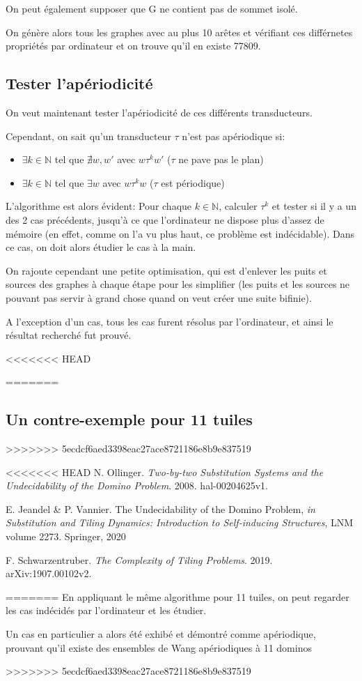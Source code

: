 \documentclass{scrartcl}
\newcommand{\N}{\mathbb N}
\theoremstyle{definition}
\theoremstyle{remark}
\begin{document}
On peut également supposer que G ne contient pas de sommet isolé.

On génère alors tous les graphes avec au plus 10 arêtes et vérifiant ces différnetes propriétés par ordinateur
et on trouve qu'il en existe 77809.

\subsection{Tester l'apériodicité}

On veut maintenant tester l'apériodicité de ces différents transducteurs.

Cependant, on sait qu'un transducteur $\tau$ n'est pas apériodique si:

\begin{itemize}
    \item $\exists k \in \N$ tel que $\nexists w,w'$ avec $w \tau^k w'$ ($\tau$ ne pave pas le plan)
    \item $\exists k \in \N$ tel que $\exists w$ avec $w \tau^k w$ ($\tau$ est périodique)
\end{itemize}

L'algorithme est alors évident: Pour chaque $k \in \N$, calculer $\tau^k$ et tester si il y a un des 2 cas précédents,
jusqu'à ce que l'ordinateur ne dispose plus d'assez de mémoire (en effet, comme on l'a vu plus haut, ce problème est indécidable).
Dans ce cas, on doit alors étudier le cas à la main.

On rajoute cependant une petite optimisation, qui est d'enlever les puits et sources des graphes à chaque étape pour les simplifier
(les puits et les sources ne pouvant pas servir à grand chose quand on veut créer une suite bifinie).

A l'exception d'un cas, tous les cas furent résolus par l'ordinateur, et ainsi le résultat recherché fut prouvé.

<<<<<<< HEAD
\begin{thebibliography}{9}
=======
\subsection{Un contre-exemple pour 11 tuiles}
>>>>>>> 5ecdcf6aed3398eac27ace8721186e8b9e837519

<<<<<<< HEAD
   N. Ollinger. \emph{Two-by-two Substitution Systems and the Undecidability of the Domino Problem}. 2008. hal-00204625v1.
  
   E. Jeandel \& P. Vannier. The Undecidability of the Domino Problem, \emph{in} \emph{Substitution and Tiling Dynamics: Introduction to Self-inducing Structures}, LNM volume 2273. Springer, 2020

   F. Schwarzentruber. \emph{The Complexity of Tiling Problems}. 2019. arXiv:1907.00102v2.
\end{thebibliography}

=======
En appliquant le même algorithme pour 11 tuiles, on peut regarder les cas indécidés par l'ordinateur et les étudier.

Un cas en particulier a alors été exhibé et démontré comme apériodique, prouvant qu'il existe des ensembles de Wang
apériodiques à 11 dominos


>>>>>>> 5ecdcf6aed3398eac27ace8721186e8b9e837519
\end{document}
